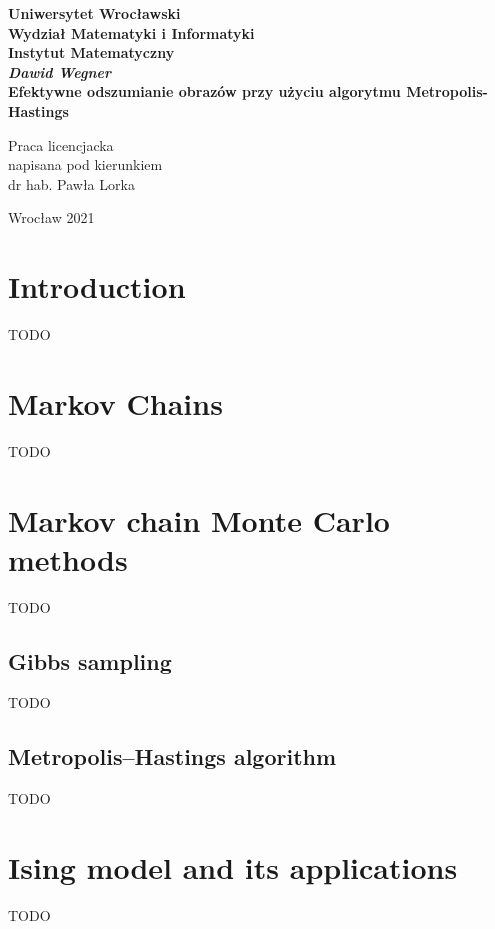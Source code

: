 \documentclass[a4paper, 11pt, onecolumn, openany, titlepage]{report}
\newcommand\blankpage{\null\thispagestyle{empty}\newpage}
\newcommand\numberedchapter[1]{\setlength\topskip{3cm}\chapter{#1}\setlength\topskip{0cm}}
\newcommand\unnumberedchapter[1]{\setlength\topskip{3cm}\chapter*{#1}\setlength\topskip{0cm}}
\begin{document}
\setlength\topskip{3cm}
\newpage
\thispagestyle{empty}
\begin{center}
\textbf{\large Uniwersytet Wrocławski\\
Wydział Matematyki i Informatyki\\
Instytut Matematyczny}\\
\vspace{4cm}
\textbf{\textit{\large Dawid Wegner}\\
\vspace{0.5cm}
{\Large Efektywne odszumianie obrazów przy użyciu algorytmu Metropolis-Hastings}}\\
\end{center}
\vspace{3cm}
{\large \hspace*{6.5cm}Praca licencjacka\\
\hspace*{6.5cm}napisana pod kierunkiem\\
\hspace*{6.5cm}dr hab. Pawła Lorka}\\
\vfill
\begin{center}
{\large Wrocław 2021}\\
\end{center}
\setlength\topskip{0cm}
\afterpage{\blankpage}

{\hypersetup{linkcolor=black}
\setlength\topskip{3cm}
\tableofcontents
\setlength\topskip{0cm}
}

\unnumberedchapter{Introduction}

TODO


\numberedchapter{Markov Chains}

TODO

\numberedchapter{Markov chain Monte Carlo methods}

TODO

\section{Gibbs sampling}

TODO

\section{Metropolis–Hastings algorithm}

TODO

\numberedchapter{Ising model and its applications}

TODO
\end{document}
